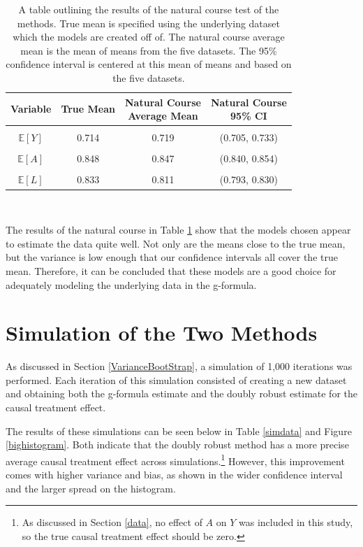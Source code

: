 \begin{table}[h!]
\centering
\begin{tabular}{c | c c c}
Variable & True Mean & \shortstack{Natural Course\\ Average Mean} & \shortstack{Natural Course \\95\% CI} \\ 
\hline \\
$\mathbb{E}[Y]$ & 0.714 & 0.719 & (0.705, 0.733) \\ \\
$\mathbb{E}[A]$ & 0.848 & 0.847 & (0.840, 0.854) \\ \\
$\mathbb{E}[L]$ & 0.833 & 0.811 & (0.793, 0.830) 
\end{tabular} \\
\centering
\caption{A table outlining the results of the natural course test of the methods.  True mean is specified using the underlying dataset which the models are created off of.  The natural course average mean is the mean of means from the five datasets.  The 95\% confidence interval is centered at this mean of means and based on the five datasets. \label{naturalcourse}}
\end{table}

The results of the natural course in Table \ref{naturalcourse} show that the models chosen appear to estimate the data quite well.  Not only are the means close to the true mean, but the variance is low enough that our confidence intervals all cover the true mean.  Therefore, it can be concluded that these models are a good choice for adequately modeling the underlying data in the g-formula.  

\section{Simulation of the Two Methods} 
As discussed in Section \ref{VarianceBootStrap}, a simulation of 1,000 iterations was performed.  Each iteration of this simulation consisted of creating a new dataset and obtaining both the g-formula estimate and the doubly robust estimate for the causal treatment effect.  

The results of these simulations can be seen below in Table \ref{simdata} and Figure \ref{bighistogram}.  Both indicate that the doubly robust method has a more precise average causal treatment effect across simulations.\footnote{As discussed in Section \ref{data}, no effect of $A$ on $Y$ was included in this study, so the true causal treatment effect should be zero.}  However, this improvement comes with higher variance and bias, as shown in the wider confidence interval and the larger spread on the histogram.  

